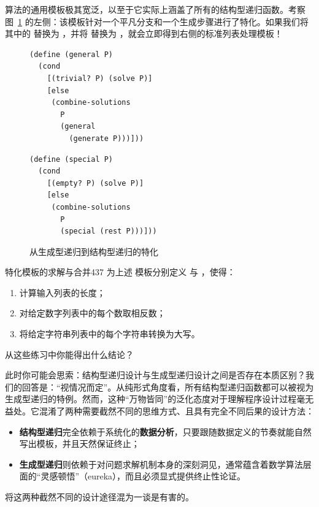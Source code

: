 算法的通用模板极其宽泛，以至于它实际上涵盖了所有的结构型递归函数。考察图~\ref{fig:gen-to-struct} 的左侧：该模板针对一个平凡分支和一个生成步骤进行了特化。如果我们将其中的  替换为 ，并将  替换为 ，就会立即得到右侧的标准列表处理模板！

\begin{figure}[htbp]
  \centering
  \begin{minipage}{0.48\textwidth}
\begin{lstlisting}[language=BSL]
(define (general P)
  (cond
    [(trivial? P) (solve P)]
    [else
     (combine-solutions
       P
       (general
         (generate P)))]))
\end{lstlisting}
  \end{minipage}
  \hfill
  \begin{minipage}{0.48\textwidth}
\begin{lstlisting}[language=BSL]
(define (special P)
  (cond
    [(empty? P) (solve P)]
    [else
     (combine-solutions
       P
       (special (rest P)))]))
\end{lstlisting}
  \end{minipage}
  \caption{从生成型递归到结构型递归的特化}
  \label{fig:gen-to-struct}
\end{figure}

\begin{exercise}{特化模板的求解与合并}{437}\label{ex:437}
为上述  模板分别定义  与 ，使得：
\begin{enumerate}
  \item {} 计算输入列表的长度；
  \item {} 对给定数字列表中的每个数取相反数；
  \item {} 将给定字符串列表中的每个字符串转换为大写。
\end{enumerate}
从这些练习中你能得出什么结论？
\end{exercise}

此时你可能会思索：结构型递归设计与生成型递归设计之间是否存在本质区别？我们的回答是：“视情况而定”。从纯形式角度看，所有结构型递归函数都可以被视为生成型递归的特例。然而，这种“万物皆同”的泛化态度对于理解程序设计过程毫无益处。它混淆了两种需要截然不同的思维方式、且具有完全不同后果的设计方法：
\begin{itemize}
  \item \textbf{结构型递归}完全依赖于系统化的\textbf{数据分析}，只要跟随数据定义的节奏就能自然写出模板，并且天然保证终止；
  \item \textbf{生成型递归}则依赖于对问题求解机制本身的深刻洞见，通常蕴含着数学算法层面的“灵感顿悟”（eureka），而且必须显式提供终止性论证。
\end{itemize}
将这两种截然不同的设计途径混为一谈是有害的。

